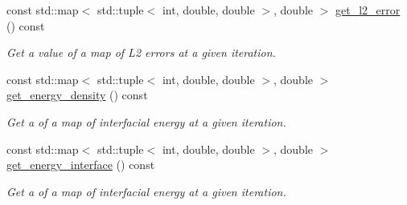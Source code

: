 \begin{DoxyCompactItemize}
const std\+::map$<$ std\+::tuple$<$ int, double, double $>$, double $>$ \hyperlink{classPhaseFieldOperatorBase_adc993d94274e82bc06f9555fbecbd310}{get\+\_\+l2\+\_\+error} () const
\begin{DoxyCompactList}\small\item\em Get a value of a map of L2 errors at a given iteration. \end{DoxyCompactList}\item 
const std\+::map$<$ std\+::tuple$<$ int, double, double $>$, double $>$ \hyperlink{classPhaseFieldOperatorBase_a8428da5d747f60f7ccbd79c879ca8d25}{get\+\_\+energy\+\_\+density} () const
\begin{DoxyCompactList}\small\item\em Get a of a map of interfacial energy at a given iteration. \end{DoxyCompactList}\item 
const std\+::map$<$ std\+::tuple$<$ int, double, double $>$, double $>$ \hyperlink{classPhaseFieldOperatorBase_ac194823660f85a12d8edcf4520bbc025}{get\+\_\+energy\+\_\+interface} () const
\begin{DoxyCompactList}\small\item\em Get a of a map of interfacial energy at a given iteration. \end{DoxyCompactList}\end{DoxyCompactItemize}
